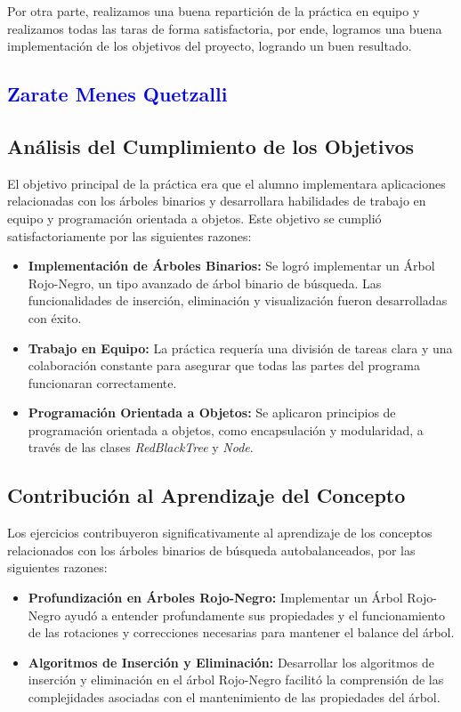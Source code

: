 \documentclass[12pt]{article}
\begin{document}
Por otra parte, realizamos una buena repartición de la práctica en equipo y realizamos todas las taras de forma satisfactoria, por ende, logramos una buena implementación de los objetivos del proyecto, logrando un buen resultado. 

\subsection*{\textcolor{blue}{Zarate Menes Quetzalli}}
\subsection*{Análisis del Cumplimiento de los Objetivos}

El objetivo principal de la práctica era que el alumno implementara aplicaciones relacionadas con los árboles binarios y desarrollara habilidades de trabajo en equipo y programación orientada a objetos. Este objetivo se cumplió satisfactoriamente por las siguientes razones:

\begin{itemize}
    \item \textbf{Implementación de Árboles Binarios:} Se logró implementar un Árbol Rojo-Negro, un tipo avanzado de árbol binario de búsqueda. Las funcionalidades de inserción, eliminación y visualización fueron desarrolladas con éxito.
    \item \textbf{Trabajo en Equipo:} La práctica requería una división de tareas clara y una colaboración constante para asegurar que todas las partes del programa funcionaran correctamente.
    \item \textbf{Programación Orientada a Objetos:} Se aplicaron principios de programación orientada a objetos, como encapsulación y modularidad, a través de las clases \textit{RedBlackTree} y \textit{Node}.
\end{itemize}

\subsection*{Contribución al Aprendizaje del Concepto}

Los ejercicios contribuyeron significativamente al aprendizaje de los conceptos relacionados con los árboles binarios de búsqueda autobalanceados, por las siguientes razones:

\begin{itemize}
    \item \textbf{Profundización en Árboles Rojo-Negro:} Implementar un Árbol Rojo-Negro ayudó a entender profundamente sus propiedades y el funcionamiento de las rotaciones y correcciones necesarias para mantener el balance del árbol.
    \item \textbf{Algoritmos de Inserción y Eliminación:} Desarrollar los algoritmos de inserción y eliminación en el árbol Rojo-Negro facilitó la comprensión de las complejidades asociadas con el mantenimiento de las propiedades del árbol.
\end{itemize}
\end{document}
